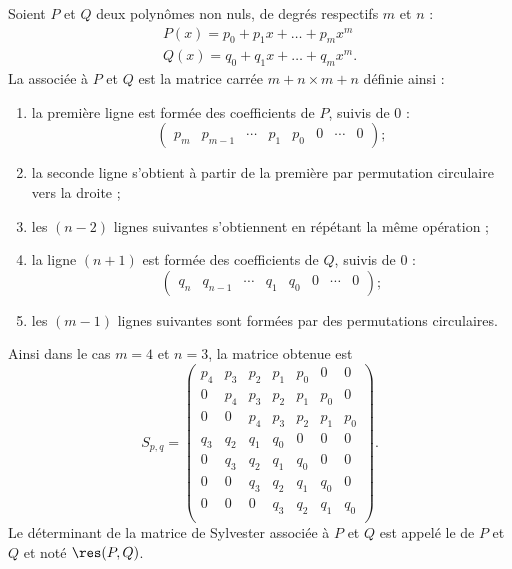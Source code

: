 Soient \( P\) et \( Q\) deux polynômes non nuls, de degrés respectifs \( m\) et \( n\) :
\begin{subequations}
    \begin{align}
        P(x)=p_0+p_1x+\ldots +p_mx^m\\
        Q(x)=q_0+q_1x+\ldots +q_mx^m.
    \end{align}
\end{subequations}
La  associée à \( P\) et \( Q\) est la matrice carrée \( m+n\times m+n\) définie ainsi :
\begin{enumerate}
    \item
la première ligne est formée des coefficients de \( P\), suivis de 0 :
\begin{equation}
\begin{pmatrix} p_m & p_{m-1} & \cdots & p_1 & p_0 & 0 & \cdots & 0 \end{pmatrix} ;
\end{equation}
\item la seconde ligne s'obtient à partir de la première par permutation circulaire vers la droite ;
\item les $(n-2)$ lignes suivantes s'obtiennent en répétant la même opération ;
\item la ligne $(n+1)$ est formée des coefficients de \( Q\), suivis de 0 :
    \begin{equation}
    \begin{pmatrix} q_n & q_{n-1} & \cdots & q_1 & q_0 & 0 & \cdots & 0 \end{pmatrix} ;
    \end{equation}
    \item les $(m-1)$ lignes suivantes sont formées par des permutations circulaires.
\end{enumerate}

Ainsi dans le cas $m=4$ et $n=3$, la matrice obtenue est
\begin{equation}    \label{EqPEgtle}
S_{p,q}=\begin{pmatrix} 
p_4 & p_3 & p_2 & p_1 & p_0 & 0 & 0 \\
0 & p_4 & p_3 & p_2 & p_1 & p_0 & 0 \\
0 & 0 & p_4 & p_3 & p_2 & p_1 & p_0 \\
q_3 & q_2 & q_1 & q_0 & 0 & 0 & 0 \\
0 & q_3 & q_2 & q_1 & q_0 & 0 & 0 \\
0 & 0 & q_3 & q_2 & q_1 & q_0 & 0 \\
0 & 0 & 0 & q_3 & q_2 & q_1 & q_0 \\
\end{pmatrix}.
\end{equation}
Le déterminant de la matrice de Sylvester associée à \( P\) et \( Q\) est appelé le  de \( P\) et \( Q\) et noté \( \res(P,Q)\).

